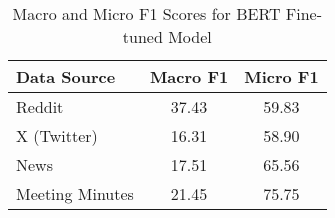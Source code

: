 \begin{table}[htbp]
\centering
\begin{tabular}{lcc}
\toprule
Data Source & Macro F1 & Micro F1 \\
\midrule
Reddit & 37.43 & 59.83 \\
X (Twitter) & 16.31 & 58.90 \\
News & 17.51 & 65.56 \\
Meeting Minutes & 21.45 & 75.75 \\
\bottomrule
\end{tabular}
\centering\caption{Macro and Micro F1 Scores for BERT Fine-tuned Model}
\label{tab:bert_macro_micro}
\end{table}